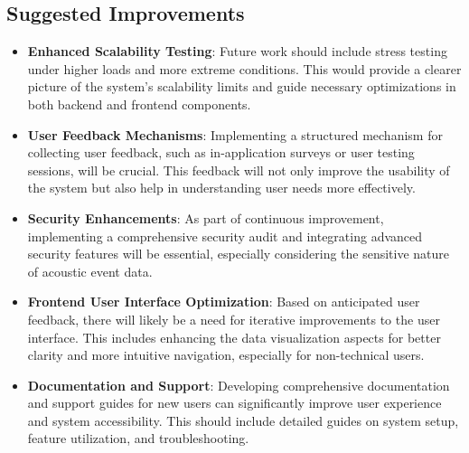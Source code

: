 \subsection{Suggested Improvements}
\begin{itemize}
  \item \textbf{Enhanced Scalability Testing}: Future work should include stress testing under higher loads and more extreme conditions. This would provide a clearer picture of the system's scalability limits and guide necessary optimizations in both backend and frontend components.
  \item \textbf{User Feedback Mechanisms}: Implementing a structured mechanism for collecting user feedback, such as in-application surveys or user testing sessions, will be crucial. This feedback will not only improve the usability of the system but also help in understanding user needs more effectively.
  \item \textbf{Security Enhancements}: As part of continuous improvement, implementing a comprehensive security audit and integrating advanced security features will be essential, especially considering the sensitive nature of acoustic event data.
  \item \textbf{Frontend User Interface Optimization}: Based on anticipated user feedback, there will likely be a need for iterative improvements to the user interface. This includes enhancing the data visualization aspects for better clarity and more intuitive navigation, especially for non-technical users.
  \item \textbf{Documentation and Support}: Developing comprehensive documentation and support guides for new users can significantly improve user experience and system accessibility. This should include detailed guides on system setup, feature utilization, and troubleshooting.
\end{itemize}
